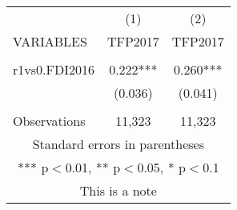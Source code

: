 \documentclass[]{article}
\begin{document}
\begin{tabular}{lcc} \hline
 & (1) & (2) \\
VARIABLES & TFP2017 & TFP2017 \\ \hline
 &  &  \\
r1vs0.FDI2016 & 0.222*** & 0.260*** \\
 & (0.036) & (0.041) \\
 &  &  \\
 Observations & 11,323 & 11,323 \\ \hline
\multicolumn{3}{c}{ Standard errors in parentheses} \\
\multicolumn{3}{c}{ *** p$<$0.01, ** p$<$0.05, * p$<$0.1} \\
\multicolumn{3}{c}{ This is a note} \\
\end{tabular}
\end{document}
